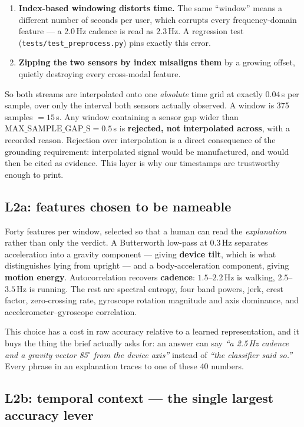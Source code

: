 \documentclass[11pt,a4paper]{article}
\newcommand{\code}[1]{\texttt{\small #1}}
\begin{document}
\begin{enumerate}
\item \textbf{Index-based windowing distorts time.} The same ``window'' means a
different number of seconds per user, which corrupts every frequency-domain feature ---
a 2.0\,Hz cadence is read as 2.3\,Hz. A regression test
(\code{tests/test\_preprocess.py}) pins exactly this error.
\item \textbf{Zipping the two sensors by index misaligns them} by a growing offset,
quietly destroying every cross-modal feature.
\end{enumerate}

So both streams are interpolated onto one \emph{absolute} time grid at exactly
$0.04$\,s per sample, over only the interval both sensors actually observed. A window is
375 samples $=15$\,s. Any window containing a sensor gap wider than
$\mathrm{MAX\_SAMPLE\_GAP\_S}=0.5$\,s is \textbf{rejected, not interpolated across},
with a recorded reason. Rejection over interpolation is a direct consequence of the
grounding requirement: interpolated signal would be manufactured, and would then be
cited as evidence. This layer is why our timestamps are trustworthy enough to print.

\subsection{L2a: features chosen to be nameable}

Forty features per window, selected so that a human can read the \emph{explanation}
rather than only the verdict. A Butterworth low-pass at $0.3$\,Hz separates
acceleration into a gravity component --- giving \textbf{device tilt}, which is what
distinguishes lying from upright --- and a body-acceleration component, giving
\textbf{motion energy}. Autocorrelation recovers \textbf{cadence}: $1.5$--$2.2$\,Hz is
walking, $2.5$--$3.5$\,Hz is running. The rest are spectral entropy, four band powers,
jerk, crest factor, zero-crossing rate, gyroscope rotation magnitude and axis
dominance, and accelerometer--gyroscope correlation.

This choice has a cost in raw accuracy relative to a learned representation, and it buys
the thing the brief actually asks for: an answer can say \emph{``a 2.5\,Hz cadence and a
gravity vector 85$^\circ$ from the device axis''} instead of \emph{``the classifier said
so.''} Every phrase in an explanation traces to one of these 40 numbers.

\subsection{L2b: temporal context --- the single largest accuracy lever}
\end{document}
